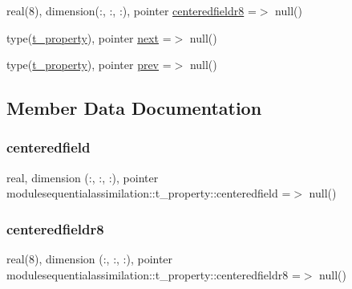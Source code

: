 \begin{DoxyCompactItemize}
\item 
real(8), dimension(\+:, \+:, \+:), pointer \mbox{\hyperlink{structmodulesequentialassimilation_1_1t__property_a16b7bd2f91ff85e5611abced8baea106}{centeredfieldr8}} =$>$ null()
\item 
type(\mbox{\hyperlink{structmodulesequentialassimilation_1_1t__property}{t\+\_\+property}}), pointer \mbox{\hyperlink{structmodulesequentialassimilation_1_1t__property_adefddaf3079a63f698ca7267ceac9e12}{next}} =$>$ null()
\item 
type(\mbox{\hyperlink{structmodulesequentialassimilation_1_1t__property}{t\+\_\+property}}), pointer \mbox{\hyperlink{structmodulesequentialassimilation_1_1t__property_a3853244e45148d88947aa824abff6555}{prev}} =$>$ null()
\end{DoxyCompactItemize}


\subsection{Member Data Documentation}
\mbox{\label{structmodulesequentialassimilation_1_1t__property_ac348d16ae3bbd051764f592b6cff47f9}} 
\subsubsection{\texorpdfstring{centeredfield}{centeredfield}}
{\footnotesize\ttfamily real, dimension (\+:, \+:, \+:), pointer modulesequentialassimilation\+::t\+\_\+property\+::centeredfield =$>$ null()\hspace{0.3cm}{\ttfamily [private]}}

\mbox{\label{structmodulesequentialassimilation_1_1t__property_a16b7bd2f91ff85e5611abced8baea106}} 
\subsubsection{\texorpdfstring{centeredfieldr8}{centeredfieldr8}}
{\footnotesize\ttfamily real(8), dimension (\+:, \+:, \+:), pointer modulesequentialassimilation\+::t\+\_\+property\+::centeredfieldr8 =$>$ null()\hspace{0.3cm}{\ttfamily [private]}}

